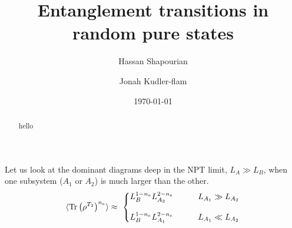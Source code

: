 \documentclass[aps,pra,groupedaddress,twocolumn,notitlepage,superscriptaddress,10pt]{revtex4-1}
\newcommand{\Tr}{\text{Tr}}
\begin{document}
\title{Entanglement transitions in random pure states}
\author{Hassan Shapourian%
  }
\author{Jonah Kudler-flam%
}


\date{\today}

\begin{abstract}
hello
\end{abstract}

\maketitle


Let us look at the dominant diagrams deep in the NPT limit, $L_A\gg L_B$, when one subsystem ($A_1$ or $A_2$) is much larger than the other. 
\begin{align}
    \braket{\Tr \left(\rho^{T_2}\right)^{n_e} } \approx \ 
    \left\{
    \begin{matrix}
    L_{B}^{1-n_e} L_{A_2}^{2-n_e} & \qquad  L_{A_1} \gg L_{A_2}
    \\
    \\
    L_{B}^{1-n_e} L_{A_1}^{2-n_e} & \qquad  L_{A_1} \ll L_{A_2}
    \end{matrix}
    \right.
\end{align}
\end{document}

